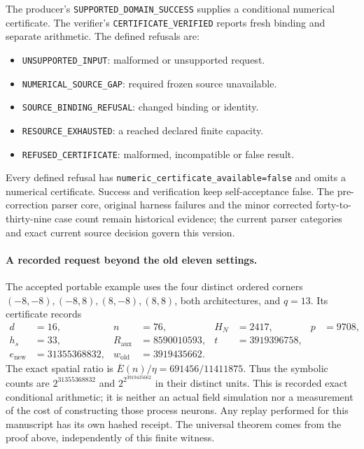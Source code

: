 The producer's \texttt{SUPPORTED\_DOMAIN\_SUCCESS} supplies a conditional
numerical certificate. The verifier's \texttt{CERTIFICATE\_VERIFIED}
reports fresh binding and separate arithmetic. The defined refusals are:
\begin{itemize}[nosep]
\item \texttt{UNSUPPORTED\_INPUT}: malformed or unsupported request.
\item \texttt{NUMERICAL\_SOURCE\_GAP}: required frozen source unavailable.
\item \texttt{SOURCE\_BINDING\_REFUSAL}: changed binding or identity.
\item \texttt{RESOURCE\_EXHAUSTED}: a reached declared finite capacity.
\item \texttt{REFUSED\_CERTIFICATE}: malformed, incompatible or false result.
\end{itemize}
Every defined refusal has
\texttt{numeric\_certificate\_available=false} and omits a numerical
certificate. Success and verification keep self-acceptance false. The
pre-correction parser core, original harness failures and the minor corrected
forty-to-thirty-nine case count remain historical evidence; the current
parser categories and exact current source decision govern this version.

\paragraph{A recorded request beyond the old eleven settings.}
The accepted portable example uses the four distinct ordered corners
$(-8,-8),(-8,8),(8,-8),(8,8)$, both architectures, and $q=13$.
Its certificate records
\begin{align*}
 d&=16,&n&=76,&H_N&=2417,&p&=9708,\\
 h_s&=33,&R_{\mathrm{aux}}&=8590010593,&t&=3919396758,\\
 e_{\mathrm{new}}&=31355368832,&w_{\mathrm{old}}&=3919435662.
\end{align*}
The exact spatial ratio is $\overline E(n)/\eta=691456/11411875$.
Thus the symbolic counts are $2^{31355368832}$ and
$2^{2^{3919435662}}$ in their distinct units. This is recorded exact
conditional arithmetic; it is neither an actual field simulation nor a
measurement of the cost of constructing those process neurons. Any replay
performed for this manuscript has its own hashed receipt. The universal
theorem comes from the proof above, independently of this finite witness.


